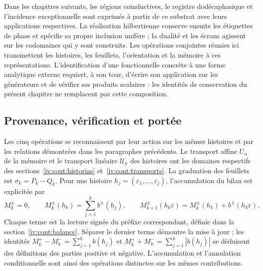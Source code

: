 Dans les chapitres suivants, les régions coinductives, le registre dodécaphasique et l’incidence exceptionnelle sont exprimés à partir de ce substrat avec leurs applications respectives. La réalisation hilbertienne conserve ensuite les étiquettes de phase et spécifie sa propre inclusion unifère ; la dualité et les écrans agissent sur les codomaines qui y sont construits. Les opérations conjointes réunies ici transmettent les histoires, les feuillets, l’orientation et la mémoire à ces représentations. L’identification d’une fonctionnelle concrète à une forme analytique externe requiert, à son tour, d’écrire son application sur les générateurs et de vérifier ses produits scalaires : les identités de conservation du présent chapitre ne remplacent pas cette composition.

\subsection{Provenance, vérification et portée}
\label{iv:cont:mapa-correlativo}
Les cinq opérations se reconnaissent par leur action sur les mêmes
histoires et par les relations démontrées dans les paragraphes précédents.
Le transport affine \(U_\alpha\) de la mémoire et le transport
linéaire \(\mathcal U_k\) des histoires ont les domaines
respectifs des sections~\ref{iv:cont:historias}
et~\ref{iv:cont:transporte}. La graduation des feuillets est
\(\sigma_k=P_k-Q_k\). Pour une histoire
\(h_j=(\varepsilon_1,\ldots,\varepsilon_j)\), l’accumulation du
bilan est explicitée par
\[
 M_0^\pm=0,\qquad
 M_k^\pm(h_k)=\sum_{j=1}^k b^\pm(h_j),\qquad
 M_{k+1}^\pm(h_k\varepsilon)
 =M_k^\pm(h_k)+b^\pm(h_k\varepsilon).
\]
Chaque terme est la lecture signée du préfixe correspondant, définie dans la section~\ref{iv:cont:balance}. Séparer le dernier terme démontre la mise à jour ; les identités \(M_k^+-M_k^-=\sum_{j=1}^kb(h_j)\) et \(M_k^++M_k^-=\sum_{j=1}^k|b(h_j)|\) se déduisent des définitions des parties positive et négative. L'accumulation et l'annulation conditionnelle sont ainsi des opérations distinctes sur les mêmes contributions.

